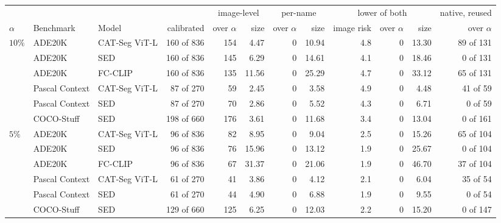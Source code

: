 \begin{tabular}{@{}lllrrrrrrrrr@{}}
\toprule
& & & & \multicolumn{2}{c}{image-level} & \multicolumn{2}{c}{per-name} & \multicolumn{3}{c}{lower of both} & native, reused \\
\cmidrule(lr){5-6}\cmidrule(lr){7-8}\cmidrule(lr){9-11}\cmidrule(l){12-12}
$\alpha$ & Benchmark & Model & calibrated & over $\alpha$ & size & over $\alpha$ & size & image risk & over $\alpha$ & size & over $\alpha$ \\
\midrule
\multirow{6}{*}{$10\%$} & ADE20K & CAT-Seg ViT-L & 160 of 836 & 154 & 4.47 & 0 & 10.94 & 4.8 & 0 & 13.30 & 89 of 131 \\
 & ADE20K & SED & 160 of 836 & 145 & 6.29 & 0 & 14.61 & 4.1 & 0 & 18.46 & 0 of 131 \\
 & ADE20K & FC-CLIP & 160 of 836 & 135 & 11.56 & 0 & 25.29 & 4.7 & 0 & 33.12 & 65 of 131 \\
 & Pascal Context & CAT-Seg ViT-L & 87 of 270 & 59 & 2.45 & 0 & 3.58 & 4.9 & 0 & 4.48 & 41 of 59 \\
 & Pascal Context & SED & 87 of 270 & 70 & 2.86 & 0 & 5.52 & 4.3 & 0 & 6.71 & 0 of 59 \\
 & COCO-Stuff & SED & 198 of 660 & 176 & 3.61 & 0 & 11.68 & 3.4 & 0 & 13.04 & 0 of 161 \\
\midrule
\multirow{6}{*}{$5\%$} & ADE20K & CAT-Seg ViT-L & 96 of 836 & 82 & 8.95 & 0 & 9.04 & 2.5 & 0 & 15.26 & 65 of 104 \\
 & ADE20K & SED & 96 of 836 & 76 & 15.96 & 0 & 13.12 & 1.9 & 0 & 25.67 & 0 of 104 \\
 & ADE20K & FC-CLIP & 96 of 836 & 67 & 31.37 & 0 & 21.06 & 1.9 & 0 & 46.70 & 37 of 104 \\
 & Pascal Context & CAT-Seg ViT-L & 61 of 270 & 41 & 3.86 & 0 & 4.12 & 2.1 & 0 & 6.04 & 35 of 54 \\
 & Pascal Context & SED & 61 of 270 & 44 & 4.90 & 0 & 6.88 & 1.9 & 0 & 9.55 & 0 of 54 \\
 & COCO-Stuff & SED & 129 of 660 & 125 & 6.25 & 0 & 12.03 & 2.2 & 0 & 15.20 & 0 of 147 \\
\bottomrule
\end{tabular}
